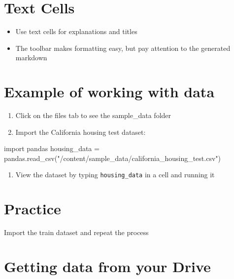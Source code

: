 \documentclass[
  letterpaper,
  DIV=11,
  numbers=noendperiod]{scrreprt}
\newenvironment{Shaded}{\begin{snugshade}}{\end{snugshade}}
\newcommand{\ImportTok}[1]{\textcolor[rgb]{0.00,0.46,0.62}{#1}}
\newcommand{\NormalTok}[1]{\textcolor[rgb]{0.00,0.23,0.31}{#1}}
\newcommand{\OperatorTok}[1]{\textcolor[rgb]{0.37,0.37,0.37}{#1}}
\newcommand{\StringTok}[1]{\textcolor[rgb]{0.13,0.47,0.30}{#1}}
\providecommand{\tightlist}{%
  \setlength{\itemsep}{0pt}\setlength{\parskip}{0pt}}\usepackage{longtable,booktabs,array}
\begin{document}
\section{Text Cells}\label{text-cells}

\begin{itemize}
\tightlist
\item
  Use text cells for explanations and titles
\item
  The toolbar makes formatting easy, but pay attention to the generated
  markdown
\end{itemize}

\section{Example of working with
data}\label{example-of-working-with-data}

\begin{enumerate}
\def\labelenumi{\arabic{enumi}.}
\tightlist
\item
  Click on the files tab to see the sample\_data folder
\item
  Import the California housing test dataset:
\end{enumerate}

\begin{Shaded}
\begin{Highlighting}[]
\ImportTok{import}\NormalTok{ pandas}
\NormalTok{housing\_data }\OperatorTok{=}\NormalTok{ pandas.read\_csv(}\StringTok{"/content/sample\_data/california\_housing\_test.csv"}\NormalTok{)}
\end{Highlighting}
\end{Shaded}

\begin{enumerate}
\def\labelenumi{\arabic{enumi}.}
\setcounter{enumi}{2}
\tightlist
\item
  View the dataset by typing \texttt{housing\_data} in a cell and
  running it
\end{enumerate}

\section{Practice}\label{practice}

Import the train dataset and repeat the process

\section{Getting data from your
Drive}\label{getting-data-from-your-drive}
\end{document}
